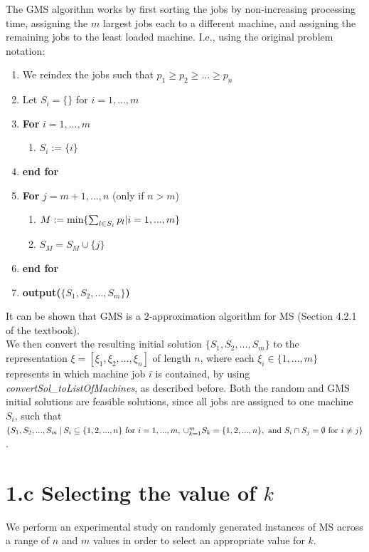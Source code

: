 \documentclass[12pt,a4paper,reqno]{article}
\begin{document}
The GMS algorithm works by first sorting the jobs by non-increasing processing time, assigning the $m$ largest jobs each to a different machine, and assigning the remaining jobs to the least loaded machine. I.e., using the original problem notation:

\begin{enumerate}
\item We reindex the jobs such that $p_1 \geq p_2 \geq ... \geq p_n$
\item Let $S_i = \{ \}$ for $i=1,...,m$
\item \textbf{For} $i=1,...,m$
\begin{enumerate}
\item $S_i := \{i \}$
\end{enumerate}
\item[] \textbf{end for}
\item \textbf{For} $j=m+1,...,n$ (only if $n > m$)
\begin{enumerate}
\item $M := \textnormal{min} \{ \sum_{l \in S_i} p_l | i = 1,...,m \}$
\item $S_M = S_M \cup \{ j \}$
\end{enumerate}
\item[] \textbf{end for}
\item \textbf{output($\{S_1,S_2,...,S_m\}$)}
\end{enumerate}

It can be shown that GMS is a $2$-approximation algorithm for MS (Section 4.2.1 of the textbook). \\

We then convert the resulting initial solution $\{S_1,S_2,...,S_m\}$ to the representation $\xi = [\xi_1,\xi_2,...,\xi_n]$ of length $n$, where each $\xi_i \in \{1,...,m\}$ represents in which machine job $i$ is contained, by using \textit{convertSol\_toListOfMachines}, as described before. Both the random and GMS initial solutions are feasible solutions, since all jobs are assigned to one machine $S_i$, such that $\{S_1,S_2,...,S_m \> | \> S_i \subseteq \{1,2,...,n\} \textnormal{ for } i=1,...,m, \> \cup_{k=1}^m S_k = \{1,2,...,n\}, \textnormal{ and } S_i \cap S_j = \emptyset \textnormal{ for } i \neq j \}$.

\section*{1.c Selecting the value of $k$} \label{sec:selectingk}
We perform an experimental study on randomly generated instances of MS across a range of $n$ and $m$ values in order to select an appropriate value for $k$. \\
\end{document}
